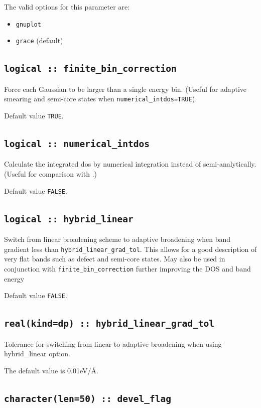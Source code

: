 \documentclass[a4paper,11pt,twoside]{book}
\begin{document}
{The valid options for this parameter are:
\begin{itemize}
\item[{\bf --}]  \verb#gnuplot#
\item[{\bf --}]  \verb#grace# (default)
\end{itemize}

\subsection[finite\_bin\_correction]{\tt logical :: finite\_bin\_correction}
Force each Gaussian to be larger than a single energy bin. (Useful for adaptive smearing and semi-core states when \verb#numerical_intdos=TRUE#).

Default value \verb#TRUE#.

\subsection[numerical\_intdos]{\tt logical :: numerical\_intdos}
Calculate the integrated dos by numerical integration instead of semi-analytically. (Useful for comparison with \lindos.)

Default value \verb#FALSE#.

\subsection[hybrid\_linear]{\tt logical :: hybrid\_linear}
Switch from linear broadening scheme to adaptive broadening when band gradient less than \verb#hybrid_linear_grad_tol#.
This allows for a good description of very flat bands such as defect and semi-core states. May also be used in conjunction
with \verb#finite_bin_correction# further improving the DOS and band energy

Default value \verb#FALSE#.

\subsection[hybrid\_linear\_grad\_tol]{\tt real(kind=dp) :: hybrid\_linear\_grad\_tol}
Tolerance for switching from linear to adaptive broadening when using hybrid\_linear option.

The default value is 0.01eV/\AA.


\subsection[devel\_flag]{\tt character(len=50) :: devel\_flag}

}
\end{document}
